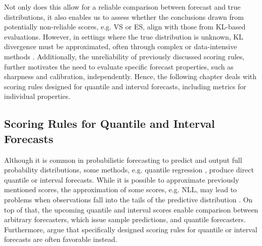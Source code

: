 \documentclass[a4paper,oneside,bibliography=totoc]{scrbook}
\begin{document}
Not only does this allow for a reliable comparison between forecast and true distributions, it also enables us to assess whether the conclusions drawn from potentially non-reliable scores, e.g. VS or ES, align with those from KL-based evaluations. 
However, in settings where the true distribution is unknown, KL divergence must be approximated, often through complex or data-intensive methods \cite{ghimire_reliable_2021, nguyen_estimating_2010}. 
Additionally, the unreliability of previously discussed scoring rules, 
further motivates the need to evaluate specific forecast properties, such as sharpness and calibration, independently.
Hence, the following chapter deals with scoring rules designed for quantile and interval forecasts, including metrics for individual properties.

\subsection{Scoring Rules for Quantile and Interval Forecasts}
\label{sec:QI}
Although it is common in probabilistic forecasting to predict and output full probability distributions, some methods, e.g. quantile regression \cite{koenker_regression_1978, koenker_quantile_2005}, produce direct quantile or interval forecasts.
While it is possible to approximate previously mentioned scores, the approximation of some scores, e.g. NLL, may lead to problems when observations fall into the tails of the predictive distribution \cite{bracher_evaluating_2021}. 
On top of that, the upcoming quantile and interval scores 
enable comparison between arbitrary forecasters, which issue sample predictions, and quantile forecasters. %
Furthermore, \citet{bracher_evaluating_2021} argue that specifically designed scoring rules for quantile or interval forecasts are often favorable instead. 
\newline
\end{document}
